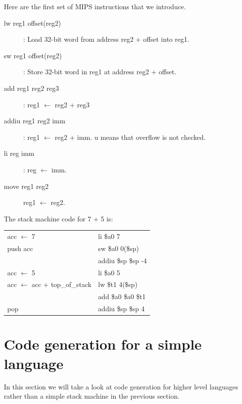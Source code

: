 Here are the first set of MIPS instructions that we introduce.
\begin{description}
\item[lw reg1 offset(reg2)]: Load 32-bit word from address \textsf{reg2 + offset} into \textsf{reg1}. 
\item[sw reg1 offset(reg2)]: Store 32-bit word in \textsf{reg1} at address \textsf{reg2 + offset}.
\item[add reg1 reg2 reg3]: \textsf{reg1 $\leftarrow$ reg2 + reg3}
\item[addiu reg1 reg2 imm]: \textsf{reg1 $\leftarrow$ reg2 + imm. u} means that overflow is not checked.
\item[li reg imm]: \textsf{reg $\leftarrow$ imm}.
\item[move reg1 reg2] reg1 $\leftarrow$ reg2.
\end{description}
The stack machine code for 7 + 5 is: 
\begin{table}[H]
\sf 
\centering
\begin{tabular}{ll}
acc $\leftarrow$ 7  & li \$a0 7 \\
push acc 			& sw \$a0 0(\$sp)\\
					& addiu \$sp \$sp -4 \\
acc $\leftarrow$ 5  & li \$a0 5 \\
acc $\leftarrow$ acc + top\_of\_stack & lw \$t1 4(\$sp) \\
									  & add \$a0 \$a0 \$t1 \\
pop & addiu \$sp \$sp 4
\end{tabular}
\end{table}
\section{Code generation for a simple language}
In this section we will take a look at code generation for higher level languages rather than a simple stack machine in the previous section.

